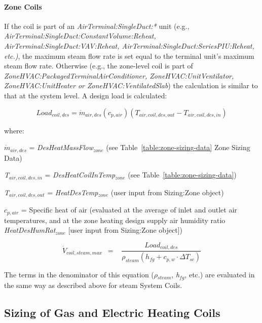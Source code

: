 \paragraph{Zone Coils}\label{zone-coils-2}

If the coil is part of an \emph{AirTerminal:SingleDuct:*} unit (e.g., \emph{Air\-Terminal:\-Single\-Duct:\-Constant\-Volume\-:Re\-heat, Air\-Terminal:\-Single\-Duct:\-VAV:\-Re\-heat, Air\-Terminal:\-Single\-Duct:\-Series\-PIU:\-Re\-heat, etc.)}, the maximum steam flow rate is set equal to the terminal unit's maximum steam flow rate. Otherwise (e.g., the zone-level coil is part of \emph{Zone\-HVAC:\-Packaged\-Terminal\-Air\-Conditioner, Zone\-HVAC\-:Unit\-Ventilator, Zone\-HVAC\-:Unit\-Heater or Zone\-HVAC:\-Ventilated\-Slab}) the calculation is similar to that at the system level. A design load is calculated:

\begin{equation}
Loa{d_{coil,des}} = {\dot m_{air,des}}({c_{p,air}})({T_{air,coil,des,out}} - {T_{air,coil,des,in}})
\end{equation}

where:

\({\dot m_{air,des}}\) = \emph{DesHeatMassFlow\(_{zone}\)} (see Table~\ref{table:zone-sizing-data} Zone Sizing Data)

\emph{T\(_{air,coil,des,in}\)} = \emph{DesHeatCoilInTemp\(_{zone}\)} (see Table~\ref{table:zone-sizing-data})

\emph{T\(_{air,coil,des,out}\)} = \emph{HeatDesTemp\(_{zone}\)} (user input from Sizing:Zone object)

\({c_{p,air}}\) = Specific heat of air (evaluated at the average of inlet and outlet air temperatures, and at the zone heating design supply air humidity ratio \emph{HeatDesHumRat\(_{zone}\)} {[}user input from Sizing:Zone object{]})

\begin{equation}
{\dot V_{coil,steam,max}}\,\,\, = \,\,\,\,\,\frac{{Loa{d_{coil,des}}}}{{{\rho_{steam}}\left( {{h_{fg}} + {c_{p,w}}\cdot \Delta {T_{sc}}} \right)}}
\end{equation}

The terms in the denominator of this equation (\emph{\(\rho\)\(_{steam}\)}, \emph{h\(_{fg}\)}, etc.) are evaluated in the same way as described above for steam System Coils.

\subsection{Sizing of Gas and Electric Heating Coils}\label{sizing-of-gas-and-electric-heating-coils}

